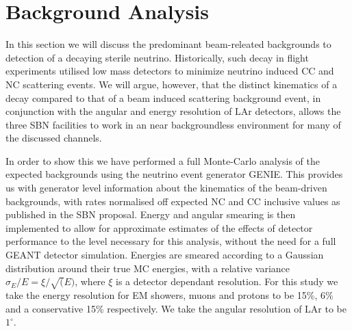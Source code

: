 \documentclass[11pt, a4paper]{article}
\begin{document}
%
%
%
%
%

\section{Background Analysis\label{sec:bg}}
In this section we will discuss the predominant beam-releated backgrounds to detection of a decaying sterile neutrino. Historically, such decay in flight experiments utilised low mass detectors to minimize neutrino induced CC and NC scattering events. We will argue, however, that the distinct kinematics of a decay compared to that of a beam induced scattering background event, in conjunction with the angular and energy resolution of LAr detectors, allows the three SBN facilities to work in an near backgroundless environment for many of the discussed channels.

In order to show this we have performed a full Monte-Carlo analysis of the expected backgrounds using the neutrino event generator GENIE. This provides us with generator level information about the kinematics of the beam-driven backgrounds, with rates normalised off expected NC and CC inclusive values as published in the SBN proposal. Energy and angular smearing is then implemented to allow for approximate estimates of the effects of detector performance to the level necessary for this analysis, without the need for a full GEANT detector simulation. Energies are smeared according to a Gaussian distribution around their true MC energies, with a relative variance $\sigma_E/E = \xi/ \sqrt(E) $, where $\xi$ is a detector dependant resolution. For this study we take the energy resolution for EM showers, muons and protons to be 15\%, 6\% and a conservative 15\% respectively. We take the angular resolution of LAr to be $1^{\circ}$. 
\end{document}
